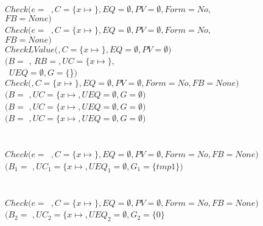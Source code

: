\begin{small}
\begin{tabbing}
\>\>\\
\>\>\>$Check(e=$~$, C=\{x \mapsto$$\},
       EQ=\emptyset,PV=\emptyset, Form = No,$\\
\>\>\>\>\>\>$FB = None)$\\
\>\>\>\>$Check(e=$~$, C=\{x \mapsto$$\},
         EQ=\emptyset,PV=\emptyset, Form = No,$\\
\>\>\>\>\>\>\>$FB = None)$\\
\>\>\>\>\>$CheckLValue($$, C = \{x \mapsto$$\}, EQ = \emptyset, PV = \emptyset)$ \\
\>\>\>\>\>\>$(B = $ , $RB = $$,
                     UC = \{x \mapsto$$\},$\\
\>\>\>\>\>\>~$UEQ = \emptyset, G = \{$\}$)$ \\
\>\>\>\>\>\>$Check($$,C  =\{x\mapsto$$\}, EQ = \emptyset, PV = \emptyset,
                         Form = No, FB = None)$\\
\>\>\>\>\>\>$(B = $ $, UC = \{x\mapsto$$ , UEQ = \emptyset,
               G = \emptyset)$\\
\>\>\>\>\>$(B = $ $, UC = \{x\mapsto$$ , UEQ = \emptyset,
               G = \emptyset)$\\
\>\>\>\>$(B = $ $, UC = \{x\mapsto$$ , UEQ = \emptyset,
          G = \emptyset)$\\  \\
\>\>\\
\>\>\>$Check(e=$~$, C=\{x \mapsto$$\},
         EQ=\emptyset,PV=\emptyset, Form = No, FB = None)$\\
\>\>\>\>$(B_1 = $ $, {UC}_1 = \{x\mapsto$$,
                {UEQ}_1 = \emptyset, G_1 = \{tmp1\})$\\

\\
\>\>\\
\>\>\>$Check(e=$~$, C=\{x \mapsto$$\},
         EQ=\emptyset,PV=\emptyset, Form = No, FB = None)$\\
\>\>\>\>$(B_2 = $ $, {UC}_2 = \{x\mapsto$$,
               {UEQ}_2 = \emptyset, G_2 = \{ 0 \}$\\ \\


\end{tabbing}
\end{small}
